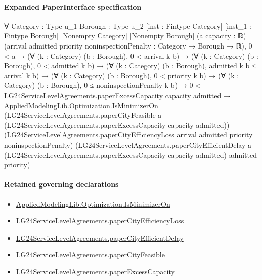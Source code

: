 \documentclass[10pt]{article}
\begin{document}
\paragraph{Expanded PaperInterface specification}
\begin{ReviewVerbatim}
∀ {Category : Type u_1} {Borough : Type u_2} [inst : Fintype Category] [inst_1 : Fintype Borough] [Nonempty Category]
  [Nonempty Borough] (a capacity : ℝ) (arrival admitted priority noninspectionPenalty : Category → Borough → ℝ),
  0 < a →
    (∀ (k : Category) (b : Borough), 0 < arrival k b) →
      (∀ (k : Category) (b : Borough), 0 < admitted k b) →
        (∀ (k : Category) (b : Borough), admitted k b ≤ arrival k b) →
          (∀ (k : Category) (b : Borough), 0 < priority k b) →
            (∀ (k : Category) (b : Borough), 0 ≤ noninspectionPenalty k b) →
              0 < LG24ServiceLevelAgreements.paperExcessCapacity capacity admitted →
                AppliedModelingLib.Optimization.IsMinimizerOn
                  (LG24ServiceLevelAgreements.paperCityFeasible a
                    (LG24ServiceLevelAgreements.paperExcessCapacity capacity admitted))
                  (LG24ServiceLevelAgreements.paperCityEfficiencyLoss arrival admitted priority noninspectionPenalty)
                  (LG24ServiceLevelAgreements.paperCityEfficientDelay a
                    (LG24ServiceLevelAgreements.paperExcessCapacity capacity admitted) admitted priority)
\end{ReviewVerbatim}

\paragraph{Retained governing declarations}
\begin{itemize}\raggedright
\item \hyperlink{governing-declaration-797bcd85b4b26271}{Applied\allowbreak{}Modeling\allowbreak{}Lib.\allowbreak{}Optimization.\allowbreak{}Is\allowbreak{}Minimizer\allowbreak{}On}
\item \hyperlink{governing-declaration-f4d78bf533bbcb40}{LG24\allowbreak{}Service\allowbreak{}Level\allowbreak{}Agreements.\allowbreak{}paper\allowbreak{}City\allowbreak{}Efficiency\allowbreak{}Loss}
\item \hyperlink{governing-declaration-453cff1a6b01907e}{LG24\allowbreak{}Service\allowbreak{}Level\allowbreak{}Agreements.\allowbreak{}paper\allowbreak{}City\allowbreak{}Efficient\allowbreak{}Delay}
\item \hyperlink{governing-declaration-828e4e7041a93200}{LG24\allowbreak{}Service\allowbreak{}Level\allowbreak{}Agreements.\allowbreak{}paper\allowbreak{}City\allowbreak{}Feasible}
\item \hyperlink{governing-declaration-cfc6c9e8c89655cd}{LG24\allowbreak{}Service\allowbreak{}Level\allowbreak{}Agreements.\allowbreak{}paper\allowbreak{}Excess\allowbreak{}Capacity}
\end{itemize}
\end{document}
